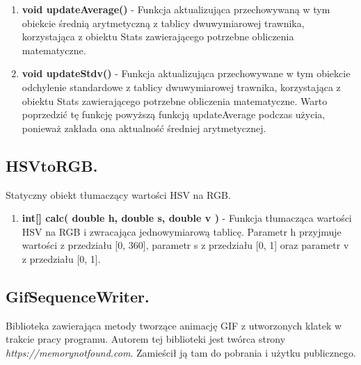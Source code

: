 \documentclass[a4paper]{article}
\begin{document}
\begin{enumerate}
    	\item \textbf{void updateAverage()} - Funkcja aktualizująca przechowywaną w tym obiekcie średnią arytmetyczną z tablicy dwuwymiarowej trawnika, korzystająca z obiektu Stats zawierającego potrzebne obliczenia matematyczne.
    	\item \textbf{void updateStdv()} - Funkcja aktualizująca przechowywane w tym obiekcie odchylenie standardowe z tablicy dwuwymiarowej trawnika, korzystająca z obiektu Stats zawierającego potrzebne obliczenia matematyczne. Warto poprzedzić tę funkcję powyższą funkcją updateAverage podczas użycia, ponieważ zakłada ona aktualność średniej arytmetycznej.
\end{enumerate}

\subsection{HSVtoRGB.}
Statyczny obiekt tłumaczący wartości HSV na RGB.
\begin{enumerate}
    	\item \textbf{int[] calc( double h, double s, double v )} - Funkcja tłumacząca wartości HSV na RGB i zwracająca jednowymiarową tablicę. Parametr h przyjmuje wartości z przedziału [0, 360], parametr s z przedziału [0, 1] oraz parametr v z przedziału [0, 1].
\end{enumerate}

\subsection{GifSequenceWriter.}
Biblioteka zawierająca metody tworzące animację GIF z utworzonych klatek w trakcie pracy programu. Autorem tej biblioteki jest twórca strony \emph{https://memorynotfound.com}. Zamieścił ją tam do pobrania i użytku publicznego.
\end{document}
